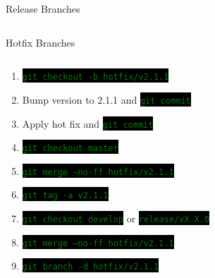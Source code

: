 \documentclass[
14pt,
aspectratio=169,
usenames,
dvipsnames,
x11names]{beamer}
\newcommand{\code}[1]{{\small\colorbox{black}{\textcolor{green}{\texttt{#1}}}}}
\begin{document}
\begin{frame}{Release Branches}
\begin{columns}
\begin{column}{.38\linewidth}
    \end{column}
  \end{columns}
\end{frame}

\begin{frame}{Hotfix Branches}
  \begin{columns}
    \begin{column}{.65\linewidth}
      \minipage[c][0.75\textheight][s]{\columnwidth}
      \begin{enumerate} \setlength{\itemsep}{\fill}
      \item \code{git checkout -b hotfix/v2.1.1}
      \item Bump version to 2.1.1 and \code{git commit}
      \item Apply hot fix and \code{git commit}
      \item \code{git checkout master}
      \item \code{git merge --no-ff hotfix/v2.1.1}
      \item \code{git tag -a v2.1.1}
      \item \code{git checkout develop} or \code{release/vX.X.0}
      \item \code{git merge --no-ff hotfix/v2.1.1}
      \item \code{git branch -d hotfix/v2.1.1}
      \end{enumerate}
      \endminipage
    \end{column}
    \begin{column}{.35\linewidth}
      \centering

\end{column}
\end{columns}
\end{frame}
\end{document}
